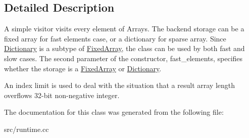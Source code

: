 \subsection{Detailed Description}
A simple visitor visits every element of Array\textquotesingle{}s. The backend storage can be a fixed array for fast elements case, or a dictionary for sparse array. Since \hyperlink{classv8_1_1internal_1_1_dictionary}{Dictionary} is a subtype of \hyperlink{classv8_1_1internal_1_1_fixed_array}{Fixed\+Array}, the class can be used by both fast and slow cases. The second parameter of the constructor, fast\+\_\+elements, specifies whether the storage is a \hyperlink{classv8_1_1internal_1_1_fixed_array}{Fixed\+Array} or \hyperlink{classv8_1_1internal_1_1_dictionary}{Dictionary}.

An index limit is used to deal with the situation that a result array length overflows 32-\/bit non-\/negative integer. 

The documentation for this class was generated from the following file\+:\begin{DoxyCompactItemize}
\item 
src/runtime.\+cc\end{DoxyCompactItemize}
